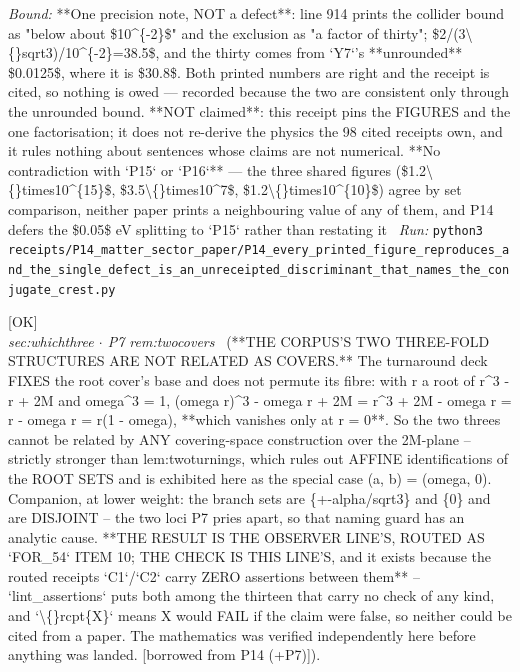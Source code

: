 \begin{description}
 \emph{Bound:}  **One precision note, NOT a defect**: line 914 prints the collider bound as "below about \$10\textasciicircum{}\{-2\}\$" and the exclusion as "a factor of thirty"; \$2/(3\textbackslash\{\}sqrt3)/10\textasciicircum{}\{-2\}=38.5\$, and the thirty comes from `Y7`'s **unrounded** \$0.0125\$, where it is \$30.8\$. Both printed numbers are right and the receipt is cited, so nothing is owed --- recorded because the two are consistent only through the unrounded bound.  **NOT claimed**: this receipt pins the FIGURES and the one factorisation; it does not re-derive the physics the 98 cited receipts own, and it rules nothing about sentences whose claims are not numerical.  **No contradiction with `P15` or `P16`** --- the three shared figures (\$1.2\textbackslash\{\}times10\textasciicircum{}\{15\}\$, \$3.5\textbackslash\{\}times10\textasciicircum{}7\$, \$1.2\textbackslash\{\}times10\textasciicircum{}\{10\}\$) agree by set comparison, neither paper prints a neighbouring value of any of them, and P14 defers the \$0.05\$ eV splitting to `P15` rather than restating it
\ \emph{Run:} \texttt{python3 receipts/P14\_matter\_sector\_paper/P14\_every\_printed\_figure\_reproduces\_and\_the\_single\_defect\_is\_an\_unreceipted\_discriminant\_that\_names\_the\_conjugate\_crest.py}
\item[\rcptlabel{P14_the_two_threes_are_not_related_as_covers}{P14R4}\textbf{P14R4}\quad\texttt{P14\_the\_two\_threes\_are\_not\_related\_as\_covers}]\hfill\textsf{[OK]}\\
\textit{sec:whichthree \ensuremath{\cdot} P7 rem:twocovers} \ (**THE CORPUS'S TWO THREE-FOLD STRUCTURES ARE NOT RELATED AS COVERS.** The turnaround deck FIXES the root cover's base and does not permute its fibre: with r a root of r\textasciicircum{}3 - r + 2M and omega\textasciicircum{}3 = 1, (omega r)\textasciicircum{}3 - omega r + 2M = r\textasciicircum{}3 + 2M - omega r = r - omega r = r(1 - omega), **which vanishes only at r = 0**. So the two threes cannot be related by ANY covering-space construction over the 2M-plane -- strictly stronger than lem:twoturnings, which rules out AFFINE identifications of the ROOT SETS and is exhibited here as the special case (a, b) = (omega, 0). Companion, at lower weight: the branch sets are \{+-alpha/sqrt3\} and \{0\} and are DISJOINT -- the two loci P7 pries apart, so that naming guard has an analytic cause. **THE RESULT IS THE OBSERVER LINE'S, ROUTED AS `FOR\_54` ITEM 10; THE CHECK IS THIS LINE'S, and it exists because the routed receipts `C1`/`C2` carry ZERO assertions between them** -- `lint\_assertions` puts both among the thirteen that carry no check of any kind, and `\textbackslash\{\}rcpt\{X\}` means X would FAIL if the claim were false, so neither could be cited from a paper. The mathematics was verified independently here before anything was landed. [borrowed from P14 (+P7)]). 

\end{description}

